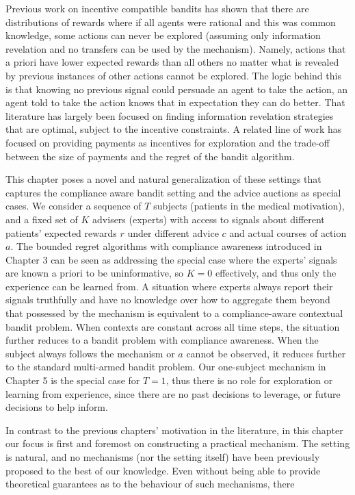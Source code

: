 Previous work on incentive compatible bandits \cite{kremer2014implementing,mansour2015bayesian} has shown that there are distributions of rewards where if all agents were rational and this was common knowledge, some actions can never be explored (assuming only information revelation and no transfers can be used by the mechanism). 
Namely, actions that a priori have lower expected rewards than all others no matter what is revealed by previous instances of other actions cannot be explored.
The logic behind this is that knowing no previous signal could persuade an agent to take the action, an agent told to take the action knows that in expectation they can do better.
That literature has largely been focused on finding information revelation strategies that are optimal, subject to the incentive constraints. 
A related line of work has focused on providing payments as incentives for exploration \citep{frazier2014incentivizing} and the trade-off between the size of payments and the regret of the bandit algorithm.



This chapter poses a novel and natural generalization of these settings that captures the compliance aware bandit setting and the advice auctions as special cases. 
We consider a sequence of $T$ subjects (patients in the medical motivation), and a fixed set of $K$ advisers (experts) with access to signals about different patients' expected rewards $r$ under different advice $c$ and actual courses of action $a$. 
The bounded regret algorithms with compliance awareness introduced in Chapter 3 can be seen as addressing the special case where the experts' signals are known a priori to be uninformative, so $K=0$ effectively, and thus only the experience can be learned from.
A situation where experts always report their signals truthfully and have no knowledge over how to aggregate them beyond that possessed by the mechanism is equivalent to a compliance-aware contextual bandit problem. 
When contexts are constant across all time steps, the situation further reduces to a bandit problem with compliance awareness.
When the subject always follows the mechanism or $a$ cannot be observed, it reduces further  to the standard multi-armed bandit problem. 
Our one-subject mechanism in Chapter 5 is the special case for $T=1$, thus there is no role for exploration or learning from experience, since there are no  past decisions to leverage, or future decisions to help inform.

In contrast to the previous chapters' motivation in the literature, in this chapter our focus is first and foremost on constructing a practical mechanism. 
The setting is natural, and no mechanisms (nor the setting itself) have been previously proposed to the best of our knowledge. Even without being able to provide theoretical guarantees as to the behaviour of such mechanisms, there 

